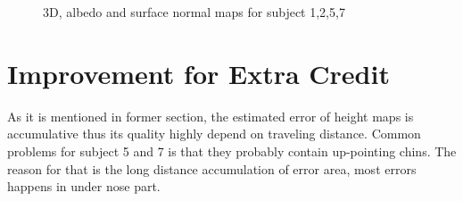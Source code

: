 \documentclass[a4paper]{article}
\begin{document}
\begin{figure}[h!]
\centering
{}
\centering
{}
\caption{3D, albedo and surface normal maps for subject 1,2,5,7\label{fig:out}}
\end{figure}

\section{Improvement for Extra Credit}
As it is mentioned in former section, the estimated error of height maps is accumulative thus its quality highly depend on traveling distance. Common problems for subject 5 and 7 is that they probably contain up-pointing chins. The reason for that is the long distance accumulation of error area, most errors happens in under nose part. 
\end{document}
